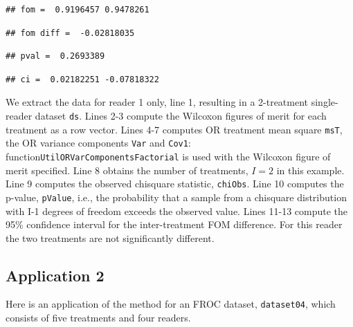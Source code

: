 \documentclass[
]{book}
\begin{document}
\begin{verbatim}
## fom =  0.9196457 0.9478261
\end{verbatim}

\begin{verbatim}
## fom diff =  -0.02818035
\end{verbatim}

\begin{verbatim}
## pval =  0.2693389
\end{verbatim}

\begin{verbatim}
## ci =  0.02182251 -0.07818322
\end{verbatim}

We extract the data for reader 1 only, line 1, resulting in a 2-treatment single-reader dataset \texttt{ds}. Lines 2-3 compute the Wilcoxon figures of merit for each treatment as a row vector. Lines 4-7 computes OR treatment mean square \texttt{msT}, the OR variance components \texttt{Var} and \texttt{Cov1}: function\texttt{UtilORVarComponentsFactorial} is used with the Wilcoxon figure of merit specified. Line 8 obtains the number of treatments, \(I=2\) in this example. Line 9 computes the observed chisquare statistic, \texttt{chiObs}. Line 10 computes the p-value, \texttt{pValue}, i.e., the probability that a sample from a chisquare distribution with I-1 degrees of freedom exceeds the observed value. Lines 11-13 compute the 95\% confidence interval for the inter-treatment FOM difference. For this reader the two treatments are not significantly different.

\hypertarget{or-method-intro-single-reader-application-froc}{%
\subsection{Application 2}\label{or-method-intro-single-reader-application-froc}}

Here is an application of the method for an FROC dataset, \texttt{dataset04}, which consists of five treatments and four readers.
\end{document}
